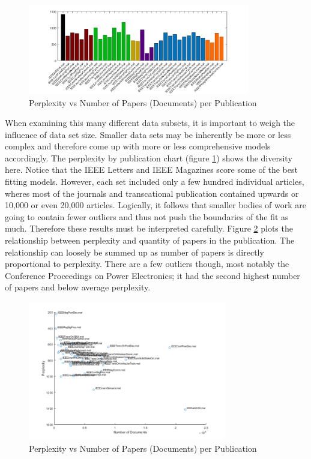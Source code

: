 \documentclass[conference]{IEEEtran}
\begin{document}
\begin{figure}
	\centering
	\includegraphics[width=3.8in]{all_ppl.png}
	\caption{Perplexity vs Number of Papers (Documents) per Publication}
	\label{fig:all_ppl}
\end{figure}

When examining this many different data subsets, it is important to weigh the influence of data set size. Smaller data sets may be inherently be more or less complex and therefore come up with more or less comprehensive models accordingly. The perplexity by publication chart (figure \ref{fig:all_ppl}) shows the diversity here. Notice that the IEEE Letters and IEEE Magazines score some of the best fitting models. However, each set included only a few hundred individual articles, wheres most of the journals and transcational publication contained upwards or 10,000 or even 20,000 articles. Logically, it follows that smaller bodies of work are going to contain fewer outliers and thus not push the boundaries of the fit as much. Therefore these results must be interpreted carefully. Figure \ref{fig:size_vs_ppl} plots the relationship between perplexity and quantity of papers in the publication. The relationship can loosely be summed up as number of papers is directly proportional to perplexity. There are a few outliers though, most notably the Conference Proceedings on Power Electronics; it had the second highest number of papers and below average perplexity.

\begin{figure}
	\centering
	\includegraphics[width=3.4in]{size_vs_ppl.png}
	\caption{Perplexity vs Number of Papers (Documents) per Publication}
	\label{fig:size_vs_ppl}
\end{figure}
\end{document}
